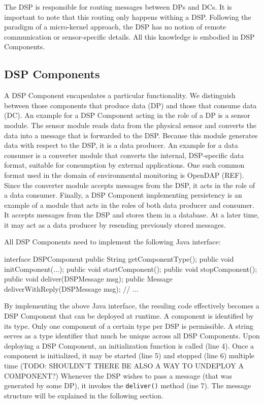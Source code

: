 \documentclass[conference]{IEEEtran}
\begin{document}
The DSP is responsible for routing messages between DPs and DCs. It is
important to note that this routing only happens withing a
DSP. Following the paradigm of a micro-kernel approach, the DSP has no
notion of remote communication or sensor-specific details. All this
knowledge is embodied in DSP Components.

\subsection{DSP Components}

A DSP Component encapsulates a particular functionality. We
distinguish between those components that produce data (DP) and those
that consume data (DC). An example for a DSP Component acting in the
role of a DP is a sensor module. The sensor module reads data from the
physical sensor and converts the data into a message that is forwarded
to the DSP. Because this module generates data with respect to the
DSP, it is a data producer. An example for a data consumer is a
converter module that converts the internal, DSP-specific data format,
suitable for consumption by external applications. One such common
format used in the domain of environmental monitoring is OpenDAP
(REF). Since the converter module accepts messages from the DSP, it
acts in the role of a data consumer. Finally, a DSP Component
implementing persistency is an example of a module that acts in the
roles of both data producer and consumer. It accepts messages from the
DSP and stores them in a database. At a later time, it may act as a
data producer by resending previously stored messages.

All DSP Components need to implement the following Java interface:

\begin{code}
interface DSPComponent
{
   public String getComponentType();
   public void initComponent(...);
   public void startComponent();
   public void stopComponent();
   public void deliver(DSPMessage msg);
   public Message deliverWithReply(DSPMessage msg);
   // ...
}
\end{code}

By implementing the above Java interface, the resuling code
effectively becomes a DSP Component that can be deployed at runtime. A
component is identified by its type. Only one component of a certain
type per DSP is permissible. A string serves as a type identifier that
much be unique across all DSP Components. Upon deploying a DSP
Component, an initialization function is called (line 4). Once a
component is initialized, it may be started (line 5) and stopped (line
6) multiple time (TODO: SHOULDN'T THERE BE ALSO A WAY TO UNDEPLOY A
COMPONENT?) Whenever the DSP wishes to pass a message (that was
generated by some DP), it invokes the \texttt{deliver()} method (ine
7). The message structure will be explained in the following section.
\end{document}
